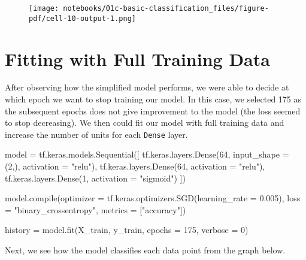 \documentclass[
  letterpaper,
  DIV=11,
  numbers=noendperiod]{scrreprt}
\newenvironment{Shaded}{\begin{snugshade}}{\end{snugshade}}
\newcommand{\BuiltInTok}[1]{\textcolor[rgb]{0.00,0.23,0.31}{#1}}
\newcommand{\DecValTok}[1]{\textcolor[rgb]{0.68,0.00,0.00}{#1}}
\newcommand{\FloatTok}[1]{\textcolor[rgb]{0.68,0.00,0.00}{#1}}
\newcommand{\NormalTok}[1]{\textcolor[rgb]{0.00,0.23,0.31}{#1}}
\newcommand{\OperatorTok}[1]{\textcolor[rgb]{0.37,0.37,0.37}{#1}}
\newcommand{\StringTok}[1]{\textcolor[rgb]{0.13,0.47,0.30}{#1}}
\begin{document}
\begin{figure}[H]

{\centering \texttt{[image: notebooks/01c-basic-classification\_files/figure-pdf/cell-10-output-1.png]}

}

\end{figure}

\hypertarget{fitting-with-full-training-data}{%
\section{Fitting with Full Training
Data}\label{fitting-with-full-training-data}}

After observing how the simplified model performs, we were able to
decide at which epoch we want to stop training our model. In this case,
we selected 175 as the subsequent epochs does not give improvement to
the model (the loss seemed to stop decreasing). We then could fit our
model with full training data and increase the number of units for each
\texttt{Dense} layer.

\begin{Shaded}
\begin{Highlighting}[]
\NormalTok{model }\OperatorTok{=}\NormalTok{ tf.keras.models.Sequential([}
\NormalTok{    tf.keras.layers.Dense(}\DecValTok{64}\NormalTok{, input\_shape }\OperatorTok{=}\NormalTok{ (}\DecValTok{2}\NormalTok{,), activation }\OperatorTok{=} \StringTok{"relu"}\NormalTok{),}
\NormalTok{    tf.keras.layers.Dense(}\DecValTok{64}\NormalTok{, activation }\OperatorTok{=} \StringTok{"relu"}\NormalTok{),}
\NormalTok{    tf.keras.layers.Dense(}\DecValTok{1}\NormalTok{, activation }\OperatorTok{=} \StringTok{"sigmoid"}\NormalTok{)}
\NormalTok{])}

\NormalTok{model.}\BuiltInTok{compile}\NormalTok{(optimizer }\OperatorTok{=}\NormalTok{ tf.keras.optimizers.SGD(learning\_rate }\OperatorTok{=} \FloatTok{0.005}\NormalTok{), }
\NormalTok{              loss }\OperatorTok{=} \StringTok{"binary\_crossentropy"}\NormalTok{,}
\NormalTok{              metrics }\OperatorTok{=}\NormalTok{ [}\StringTok{"accuracy"}\NormalTok{])}

\NormalTok{history }\OperatorTok{=}\NormalTok{ model.fit(X\_train, y\_train, epochs }\OperatorTok{=} \DecValTok{175}\NormalTok{, verbose }\OperatorTok{=} \DecValTok{0}\NormalTok{)}
\end{Highlighting}
\end{Shaded}

Next, we see how the model classifies each data point from the graph
below.
\end{document}
